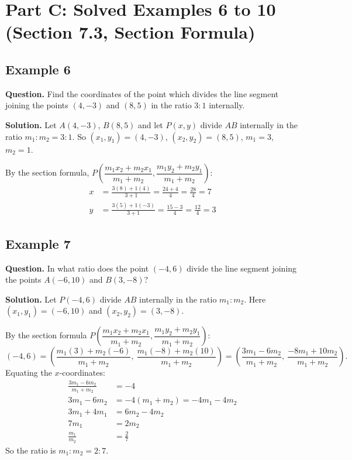 \newpage
\section*{Part C: Solved Examples 6 to 10 (Section 7.3, Section Formula)}

\subsection*{Example 6}
\textbf{Question.} Find the coordinates of the point which divides the line segment joining the points $(4,-3)$ and $(8,5)$ in the ratio $3:1$ internally.

\textbf{Solution.} Let $A(4,-3)$, $B(8,5)$ and let $P(x,y)$ divide $AB$ internally in the ratio $m_1:m_2=3:1$. So $(x_1,y_1)=(4,-3)$, $(x_2,y_2)=(8,5)$, $m_1=3$, $m_2=1$.

By the section formula, $P\left(\dfrac{m_1x_2+m_2x_1}{m_1+m_2},\dfrac{m_1y_2+m_2y_1}{m_1+m_2}\right)$:
\begin{align*}
x&=\frac{3(8)+1(4)}{3+1}=\frac{24+4}{4}=\frac{28}{4}=7\\
y&=\frac{3(5)+1(-3)}{3+1}=\frac{15-3}{4}=\frac{12}{4}=3
\end{align*}


\subsection*{Example 7}
\textbf{Question.} In what ratio does the point $(-4,6)$ divide the line segment joining the points $A(-6,10)$ and $B(3,-8)$?

\textbf{Solution.} Let $P(-4,6)$ divide $AB$ internally in the ratio $m_1:m_2$. Here $(x_1,y_1)=(-6,10)$ and $(x_2,y_2)=(3,-8)$.

By the section formula $P\left(\dfrac{m_1x_2+m_2x_1}{m_1+m_2},\dfrac{m_1y_2+m_2y_1}{m_1+m_2}\right)$:
\[
(-4,6)=\left(\frac{m_1(3)+m_2(-6)}{m_1+m_2},\ \frac{m_1(-8)+m_2(10)}{m_1+m_2}\right)=\left(\frac{3m_1-6m_2}{m_1+m_2},\ \frac{-8m_1+10m_2}{m_1+m_2}\right).
\]
Equating the $x$-coordinates:
\begin{align*}
\frac{3m_1-6m_2}{m_1+m_2}&=-4\\
3m_1-6m_2&=-4(m_1+m_2)=-4m_1-4m_2\\
3m_1+4m_1&=6m_2-4m_2\\
7m_1&=2m_2\\
\frac{m_1}{m_2}&=\frac27
\end{align*}
So the ratio is $m_1:m_2=2:7$.

